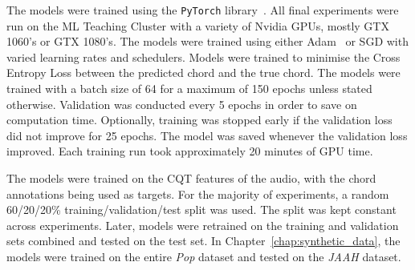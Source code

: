 The models were trained using the \texttt{PyTorch} library~\citep{pytorch}. All final experiments were run on the ML Teaching Cluster with a variety of Nvidia GPUs, mostly GTX 1060's or GTX 1080's. The models were trained using either Adam~\citep{adam} or SGD with varied learning rates and schedulers. Models were trained to minimise the Cross Entropy Loss between the predicted chord and the true chord. The models were trained with a batch size of 64 for a maximum of 150 epochs unless stated otherwise. Validation was conducted every 5 epochs in order to save on computation time. Optionally, training was stopped early if the validation loss did not improve for 25 epochs. The model was saved whenever the validation loss improved. Each training run took approximately 20 minutes of GPU time. 

The models were trained on the CQT features of the audio, with the chord annotations being used as targets. For the majority of experiments, a random 60/20/20\% training/validation/test split was used. The split was kept constant across experiments. Later, models were retrained on the training and validation sets combined and tested on the test set. In Chapter~\ref{chap:synthetic_data}, the models were trained on the entire \emph{Pop} dataset and tested on the \emph{JAAH} dataset.